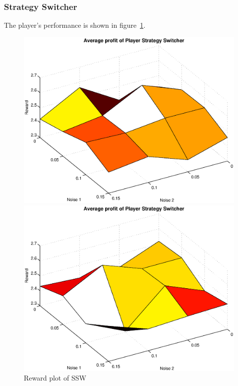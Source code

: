 \subsubsection{Strategy Switcher}
The player's performance is shown in figure~\ref{pic player ss}.\\
\begin{figure}[h]
	\caption{Reward plot of SSW}
	\label{pic player ss}
\begin{minipage}[hbt]{0.65\textwidth}
	\centering
	\includegraphics[width=\textwidth]{pics/simulation1/Reward_vs_Noise_of_Player_Strategy_Switcher}
\end{minipage}
\hfill
\begin{minipage}[hbt]{0.3\textwidth}
	\centering
	\includegraphics[width=\textwidth]{pics/simulation2/Reward_vs_Noise_of_Player_Strategy_Switcher}
\end{minipage}

\end{figure}

